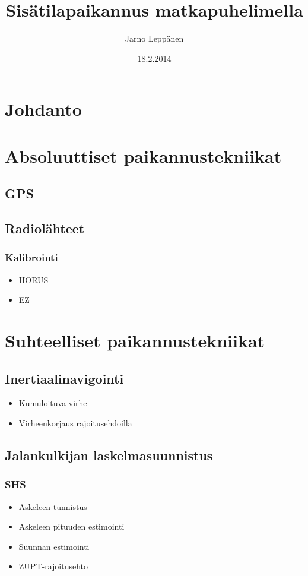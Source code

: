 \documentclass[a4paper]{scrartcl}
\author{Jarno Leppänen}
\title{Sisätilapaikannus matkapuhelimella}
\date{18.2.2014}
\begin{document}
\maketitle

\tableofcontents

\section{Johdanto}

\section{Absoluuttiset paikannustekniikat}
\subsection{GPS}
\cite{groves2013principles}
\subsection{Radiolähteet}
\cite{varshavsky2005gsm}
\subsubsection{Kalibrointi}
\begin{itemize}
\item HORUS
\item EZ
\end{itemize}

\section{Suhteelliset paikannustekniikat}
\subsection{Inertiaalinavigointi}
\begin{itemize}
\item Kumuloituva virhe
\item Virheenkorjaus rajoitusehdoilla
\end{itemize}
\cite{groves2013principles}
\subsection{Jalankulkijan laskelmasuunnistus}
\cite{harle2013survey}
\subsubsection{SHS}
\begin{itemize}
\item Askeleen tunnistus
\item Askeleen pituuden estimointi
\item Suunnan estimointi
\item ZUPT-rajoitusehto
\end{itemize}
\end{document}
